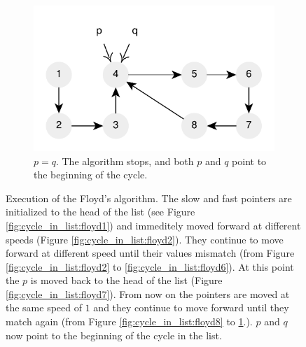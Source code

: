 \begin{figure}
\begin{subfigure}[l]{0.36\textwidth}
		\includegraphics[width=1\linewidth]{sources/cycle_in_list/images/floyd10}
		\caption{$p = q$. The algorithm stops, and both $p$ and $q$ point to the beginning of the cycle.}
		\label{fig:cycle_in_list:floyd10}
	 \end{subfigure}
	 \caption[Execution of the Floyd’s algorithm]{Execution of the Floyd’s algorithm. The slow and
	  fast pointers are initialized to the head of the list (see Figure
	  \ref{fig:cycle_in_list:floyd1}) and immeditely moved forward at different speeds (Figure
	  \ref{fig:cycle_in_list:floyd2}). They continue to move forward at different speed until their
	  values mismatch (from Figure \ref{fig:cycle_in_list:floyd2} to
	  \ref{fig:cycle_in_list:floyd6}). At this point the $p$ is moved back to the head of the list
	  (Figure \ref{fig:cycle_in_list:floyd7}). From now on the pointers are moved at the same speed
	  of $1$ and they continue to move forward until they match again (from Figure
	  \ref{fig:cycle_in_list:floyd8} to \ref{fig:cycle_in_list:floyd10}.). $p$ and $q$ now point to
	  the beginning of the cycle in the list.}
	  \label{fig:cycle_in_list:floyd}
\end{figure}
